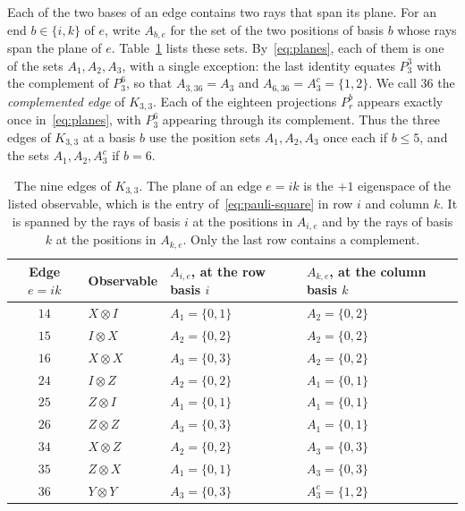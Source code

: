 Each of the two bases of an edge contains two rays that span its plane. For an end $b\in\{i,k\}$ of $e$, write $A_{b,e}$ for the set of the two positions of basis $b$ whose rays span the plane of $e$. Table~\ref{tab:edges} lists these sets. By~\eqref{eq:planes}, each of them is one of the sets $A_1,A_2,A_3$, with a single exception: the last identity equates $P^3_3$ with the complement of $P^6_3$, so that $A_{3,36}=A_3$ and $A_{6,36}=A_3^c=\{1,2\}$. We call $36$ the \emph{complemented edge} of $K_{3,3}$. Each of the eighteen projections $P^b_r$ appears exactly once in~\eqref{eq:planes}, with $P^6_3$ appearing through its complement. Thus the three edges of $K_{3,3}$ at a basis $b$ use the position sets $A_1,A_2,A_3$ once each if $b\le5$, and the sets $A_1,A_2,A_3^c$ if $b=6$.

\begin{table}[htbp]
\centering
\small
\begin{tabular}{@{}clll@{}}
\toprule
Edge $e=ik$ & Observable & $A_{i,e}$, at the row basis $i$ & $A_{k,e}$, at the column basis $k$ \\
\midrule
$14$ & $X\otimes I$ & $A_1=\{0,1\}$ & $A_2=\{0,2\}$ \\
$15$ & $I\otimes X$ & $A_2=\{0,2\}$ & $A_2=\{0,2\}$ \\
$16$ & $X\otimes X$ & $A_3=\{0,3\}$ & $A_2=\{0,2\}$ \\
$24$ & $I\otimes Z$ & $A_2=\{0,2\}$ & $A_1=\{0,1\}$ \\
$25$ & $Z\otimes I$ & $A_1=\{0,1\}$ & $A_1=\{0,1\}$ \\
$26$ & $Z\otimes Z$ & $A_3=\{0,3\}$ & $A_1=\{0,1\}$ \\
$34$ & $X\otimes Z$ & $A_2=\{0,2\}$ & $A_3=\{0,3\}$ \\
$35$ & $Z\otimes X$ & $A_1=\{0,1\}$ & $A_3=\{0,3\}$ \\
$36$ & $Y\otimes Y$ & $A_3=\{0,3\}$ & $A_3^c=\{1,2\}$ \\
\bottomrule
\end{tabular}
\caption{The nine edges of $K_{3,3}$. The plane of an edge $e=ik$ is the $+1$ eigenspace of the listed observable, which is the entry of~\eqref{eq:pauli-square} in row $i$ and column $k$. It is spanned by the rays of basis $i$ at the positions in $A_{i,e}$ and by the rays of basis $k$ at the positions in $A_{k,e}$. Only the last row contains a complement.}
\label{tab:edges}
\end{table}

